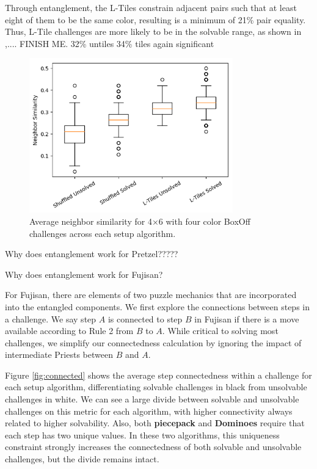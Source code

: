 \documentclass[journal]{IEEEtran}
\begin{document}
Through entanglement, the L-Tiles constrain adjacent pairs such that at least eight of them to be the same color, resulting is a minimum of 21\% pair equality. Thus, L-Tile challenges are more likely to be in the solvable range, as shown in ,.... FINISH ME. 
32\% untiles
34\% tiles
again significant

\begin{figure}[t]
\includegraphics[width=8.8cm]{boxoffneighborsim.png}
\caption{Average neighbor similarity for 4$\times$6 with four color BoxOff challenges across each setup algorithm. }
\label{fig:boxoffconnected}
\end{figure}

Why does entanglement work for Pretzel?????


Why does entanglement work for Fujisan?

For Fujisan, there are elements of two puzzle mechanics that are incorporated into the entangled components. We first explore the connections between steps in a challenge. We say step $A$ is connected to step $B$ in Fujisan if there is a move available according to Rule 2 from $B$ to $A$. While critical to solving most challenges, we simplify our connectedness calculation by ignoring the impact of intermediate Priests between $B$ and $A$. 

Figure \ref{fig:connected} shows the average step connectedness within a challenge for each setup algorithm, differentiating solvable challenges in black from unsolvable challenges in white. We can see a large divide between solvable and unsolvable challenges on this metric for each algorithm, with higher connectivity always related to higher solvability. Also, both {\bf piecepack} and {\bf Dominoes} require that each step has two unique values. In these two algorithms, this uniqueness constraint strongly increases the connectedness of both solvable and unsolvable challenges, but the divide remains intact.
\end{document}
